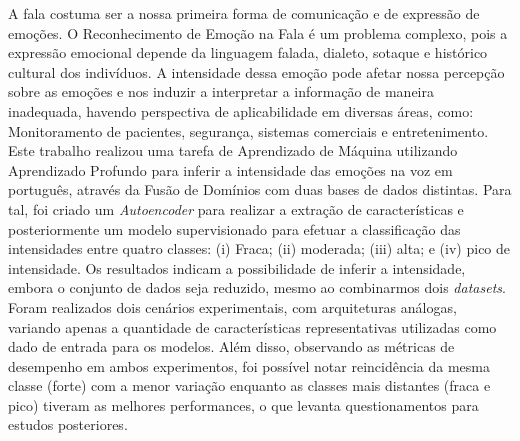 A fala costuma ser a nossa primeira forma de comunicação e de expressão de emoções. O Reconhecimento de Emoção na Fala é um problema complexo, pois a expressão emocional depende da linguagem falada, dialeto, sotaque e histórico cultural dos indivíduos. A intensidade dessa emoção pode afetar nossa percepção sobre as emoções e nos induzir a interpretar a informação de maneira inadequada, havendo perspectiva de aplicabilidade em diversas áreas, como: Monitoramento de pacientes, segurança, sistemas comerciais e entretenimento. Este trabalho realizou uma tarefa de Aprendizado de Máquina utilizando Aprendizado Profundo para inferir a intensidade das emoções na voz em português, através da Fusão de Domínios com duas bases de dados distintas. Para tal, foi criado um \textit{Autoencoder} para realizar a extração de características e posteriormente um modelo supervisionado para efetuar a classificação das intensidades entre quatro classes: (i) Fraca; (ii) moderada; (iii) alta; e (iv) pico de intensidade. Os resultados indicam a possibilidade de inferir a intensidade, embora o conjunto de dados seja reduzido, mesmo ao combinarmos dois \textit{datasets}. Foram realizados dois cenários experimentais, com arquiteturas análogas, variando apenas a quantidade de características representativas utilizadas como dado de entrada para os modelos. Além disso, observando as métricas de desempenho em ambos experimentos, foi possível notar reincidência da mesma classe (forte) com a menor variação enquanto as classes mais distantes (fraca e pico) tiveram as melhores performances, o que levanta questionamentos para estudos posteriores.

